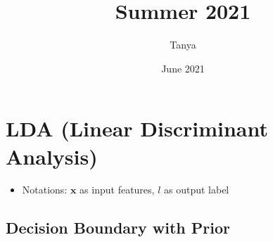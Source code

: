\documentclass[11pt]{article}
\title{Summer 2021}
\author{Tanya}
\date{June 2021}
\begin{document}
\maketitle


\section{LDA (Linear Discriminant Analysis)}
\begin{itemize}
    \item Notations: $\mathbf{x}$ as input features, $l$ as output label
\end{itemize}

\subsection{Decision Boundary with Prior}
\end{document}
